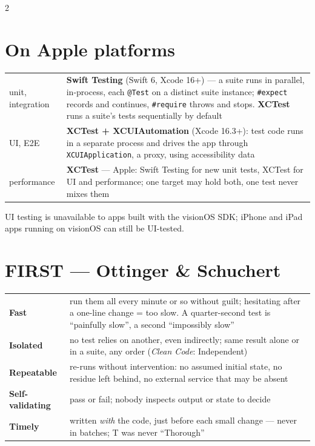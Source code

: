 \documentclass[8pt]{extarticle}
\newcommand\ct[1]{\texttt{#1}}
\begin{document}
\begin{multicols}{2}
\section{On Apple platforms}
{\scriptsize\setlength{\tabcolsep}{2.5pt}
\begin{tabular}{@{}>{\raggedright\arraybackslash}p{12mm}>{\raggedright\arraybackslash}p{61mm}@{}}
\toprule
unit, integration & \textbf{Swift Testing} (Swift 6, Xcode 16+) — a suite runs in parallel,
in-process, each \ct{@Test} on a distinct suite instance; \ct{\#expect} records and continues,
\ct{\#require} throws and stops. \textbf{XCTest} runs a suite's tests sequentially by default\\
UI, E2E & \textbf{XCTest + XCUIAutomation} (Xcode 16.3+): test code runs in a separate process and
drives the app through \ct{XCUIApplication}, a proxy, using accessibility data\\
performance & \textbf{XCTest} — Apple: Swift Testing for new unit tests, XCTest for UI and
performance; one target may hold both, one test never mixes them\\
\bottomrule
\end{tabular}}\par
UI testing is unavailable to apps built with the visionOS SDK; iPhone and iPad apps running on
visionOS can still be UI-tested.

\columnbreak

\section{FIRST — Ottinger \& Schuchert}
{\scriptsize\setlength{\tabcolsep}{2.5pt}
\begin{tabular}{@{}>{\raggedright\arraybackslash}p{15mm}>{\raggedright\arraybackslash}p{58mm}@{}}
\toprule
\textbf{\textcolor{sheetBlue}{F}ast} & run them all every minute or so without guilt; hesitating
after a one-line change = too slow. A quarter-second test is ``painfully slow'', a second
``impossibly slow''\\
\textbf{\textcolor{sheetBlue}{I}solated} & no test relies on another, even indirectly; same result
alone or in a suite, any order (\emph{Clean Code}: Independent)\\
\textbf{\textcolor{sheetBlue}{R}epeatable} & re-runs without intervention: no assumed initial state, no
residue left behind, no external service that may be absent\\
\textbf{\textcolor{sheetBlue}{S}elf-validating} & pass or fail; nobody inspects output or state to decide\\
\textbf{\textcolor{sheetBlue}{T}imely} & written \emph{with} the code, just before each small change —
never in batches; T was never ``Thorough''\\
\bottomrule
\end{tabular}}


\end{multicols}
\end{document}
